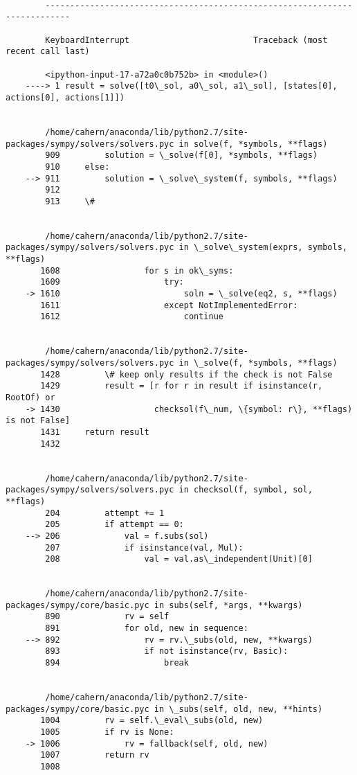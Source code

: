     \begin{Verbatim}[commandchars=\\\{\}]

        ---------------------------------------------------------------------------

        KeyboardInterrupt                         Traceback (most recent call last)

        <ipython-input-17-a72a0c0b752b> in <module>()
    ----> 1 result = solve([t0\_sol, a0\_sol, a1\_sol], [states[0], actions[0], actions[1]])
    

        /home/cahern/anaconda/lib/python2.7/site-packages/sympy/solvers/solvers.pyc in solve(f, *symbols, **flags)
        909         solution = \_solve(f[0], *symbols, **flags)
        910     else:
    --> 911         solution = \_solve\_system(f, symbols, **flags)
        912 
        913     \#


        /home/cahern/anaconda/lib/python2.7/site-packages/sympy/solvers/solvers.pyc in \_solve\_system(exprs, symbols, **flags)
       1608                 for s in ok\_syms:
       1609                     try:
    -> 1610                         soln = \_solve(eq2, s, **flags)
       1611                     except NotImplementedError:
       1612                         continue


        /home/cahern/anaconda/lib/python2.7/site-packages/sympy/solvers/solvers.pyc in \_solve(f, *symbols, **flags)
       1428         \# keep only results if the check is not False
       1429         result = [r for r in result if isinstance(r, RootOf) or
    -> 1430                   checksol(f\_num, \{symbol: r\}, **flags) is not False]
       1431     return result
       1432 


        /home/cahern/anaconda/lib/python2.7/site-packages/sympy/solvers/solvers.pyc in checksol(f, symbol, sol, **flags)
        204         attempt += 1
        205         if attempt == 0:
    --> 206             val = f.subs(sol)
        207             if isinstance(val, Mul):
        208                 val = val.as\_independent(Unit)[0]


        /home/cahern/anaconda/lib/python2.7/site-packages/sympy/core/basic.pyc in subs(self, *args, **kwargs)
        890             rv = self
        891             for old, new in sequence:
    --> 892                 rv = rv.\_subs(old, new, **kwargs)
        893                 if not isinstance(rv, Basic):
        894                     break


        /home/cahern/anaconda/lib/python2.7/site-packages/sympy/core/basic.pyc in \_subs(self, old, new, **hints)
       1004         rv = self.\_eval\_subs(old, new)
       1005         if rv is None:
    -> 1006             rv = fallback(self, old, new)
       1007         return rv
       1008 



\end{Verbatim}

